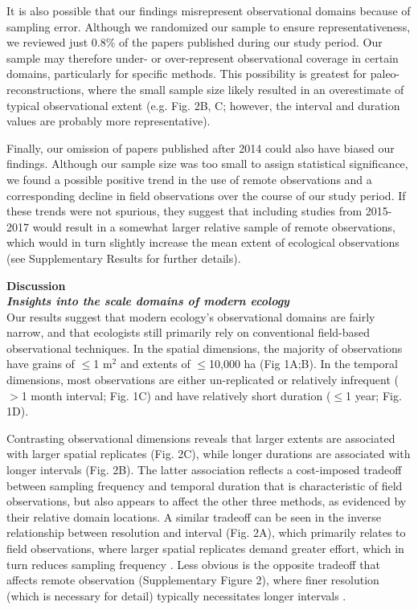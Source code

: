 \documentclass[12pt]{article}
\begin{document}
It is also possible that our findings misrepresent observational domains because of sampling error. Although we randomized our sample to ensure representativeness, we reviewed just 0.8\% of the papers published during our study period. Our sample may therefore under- or over-represent observational coverage in certain domains, particularly for specific methods. This possibility is greatest for paleo-reconstructions, where the small sample size likely resulted in an overestimate of typical observational extent (e.g. Fig. 2B, C; however, the interval and duration values are probably more representative). 

Finally, our omission of papers published after 2014 could also have biased our findings. Although our sample size was too small to assign statistical significance, we found a possible positive trend in the use of remote observations and a corresponding decline in field observations over the course of our study period. If these trends were not spurious, they suggest that including studies from 2015-2017 would result in a somewhat larger relative sample of remote observations, which would in turn slightly increase the mean extent of ecological observations (see Supplementary Results for further details). 

\vspace{10pt}
\noindent \textbf{Discussion}
\vspace{5pt}
\\
\noindent \textbf{\emph{Insights into the scale domains of modern ecology}}\\
Our results suggest that modern ecology's observational domains are fairly narrow, and that ecologists still primarily rely on conventional field-based observational techniques. In the spatial dimensions, the majority of observations have grains of $\leq$1 m$^2$ and extents of $\leq$10,000 ha (Fig 1A;B). In the temporal dimensions, most observations are either un-replicated or relatively infrequent ($>$1 month interval; Fig. 1C) and have relatively short duration ($\leq$1 year; Fig. 1D). 

Contrasting observational dimensions reveals that larger extents are associated with larger spatial replicates (Fig. 2C), while longer durations are associated with longer intervals (Fig. 2B). The latter association reflects a cost-imposed tradeoff between sampling frequency and temporal duration that is characteristic of field observations, but also appears to affect the other three methods, as evidenced by their relative domain locations. A similar tradeoff can be seen in the inverse relationship between resolution and interval (Fig. 2A), which primarily relates to field observations, where larger spatial replicates demand greater effort, which in turn reduces sampling frequency \cite{kareiva_spatial_1988}. Less obvious is the opposite tradeoff that affects remote observation (Supplementary Figure 2), where finer resolution (which is necessary for detail) typically necessitates longer intervals \cite{estes_platform_2016}.   
\end{document}
